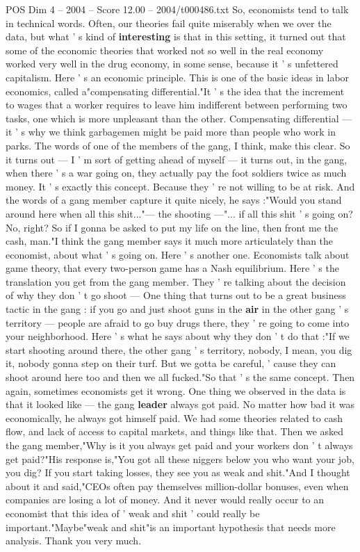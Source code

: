 \begin{textsample}{POS Dim 4 – 2004 – Score 12.00 – 2004/t000486.txt}
So, economists tend to talk in technical words.
Often, our theories fail quite miserably when we over the data, but what ' s kind of \textbf{interesting} is that in this setting, it turned out that some of the economic theories that worked not so well in the real economy worked very well in the drug economy, in some sense, because it ' s unfettered capitalism.
Here ' s an economic principle.
This is one of the basic ideas in labor economics, called a"compensating differential."It ' s the idea that the increment to wages that a worker requires to leave him indifferent between performing two tasks, one which is more unpleasant than the other.
Compensating differential — it ' s why we think garbagemen might be paid more than people who work in parks.
The words of one of the members of the gang, I think, make this clear.
So it turns out — I ' m sort of getting ahead of myself — it turns out, in the gang, when there ' s a war going on, they actually pay the foot soldiers twice as much money.
It ' s exactly this concept.
Because they ' re not willing to be at risk.
And the words of a gang member capture it quite nicely, he says :"Would you stand around here when all this shit..."— the shooting —"... if all this shit ' s going on?
No, right?
So if I gonna be asked to put my life on the line, then front me the cash, man."I think the gang member says it much more articulately than the economist, about what ' s going on.
Here ' s another one.
Economists talk about game theory, that every two-person game has a Nash equilibrium.
Here ' s the translation you get from the gang member.
They ' re talking about the decision of why they don ' t go shoot — One thing that turns out to be a great business tactic in the gang : if you go and just shoot guns in the \textbf{air} in the other gang ' s territory — people are afraid to go buy drugs there, they ' re going to come into your neighborhood.
Here ' s what he says about why they don ' t do that :"If we start shooting around there, the other gang ' s territory, nobody, I mean, you dig it, nobody gonna step on their turf.
But we gotta be careful, ' cause they can shoot around here too and then we all fucked."So that ' s the same concept.
Then again, sometimes economists get it wrong.
One thing we observed in the data is that it looked like — the gang \textbf{leader} always got paid.
No matter how bad it was economically, he always got himself paid.
We had some theories related to cash flow, and lack of access to capital markets, and things like that.
Then we asked the gang member,"Why is it you always get paid and your workers don ' t always get paid?"His response is,"You got all these niggers below you who want your job, you dig?
If you start taking losses, they see you as weak and shit."And I thought about it and said,"CEOs often pay themselves million-dollar bonuses, even when companies are losing a lot of money.
And it never would really occur to an economist that this idea of ' weak and shit ' could really be important."Maybe"weak and shit"is an important hypothesis that needs more analysis.
Thank you very much.

\end{textsample}
